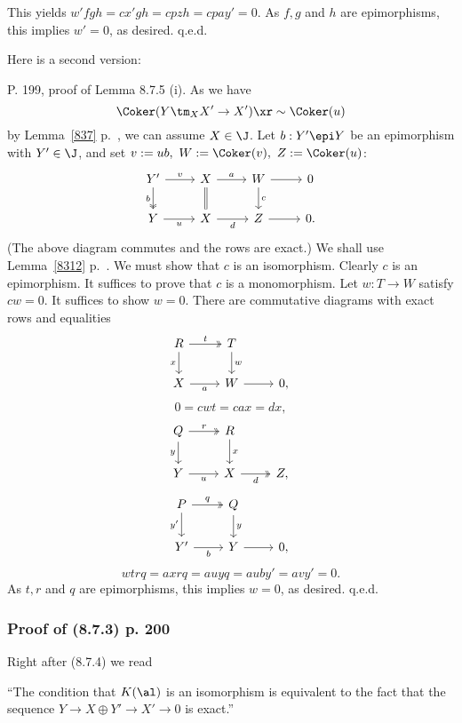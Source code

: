 \documentclass[12pt]{article}
\theoremstyle{remark}
\theoremstyle{definition}
\begin{document}
This yields $w'fgh=cx'gh=cpzh=cpay'=0$. As $f,g$ and $h$ are epimorphisms, this implies $w'=0$, as desired. q.e.d. 

Here is a second version: 


P. 199, proof of Lemma 8.7.5 (i). As we have 
$$
\Coker(Y\tm_XX'\to X')\xr\sim\Coker(u)
$$ 
by Lemma~\ref{837} p.~, we can assume $X\in\J$. Let $b:Y'\epi Y$ be an epimorphism with $Y'\in\J$, and set $v:=ub,\ W:=\Coker(v),\ Z:=\Coker(u)$: 
$$
\begin{tikzcd}
Y'\ar[d,two heads,"b"']\ar[r,"v"]&X\ar[d,equal]\ar[r,"a"]&W\ar[d,"c"]\ar[r]&0\\ 
Y\ar[r,"u"']&X\ar[r,"d"']&Z\ar[r]&0.
\end{tikzcd}
$$ 
(The above diagram commutes and the rows are exact.) We shall use Lemma~\ref{8312} p.~. We must show that $c$ is an isomorphism. Clearly $c$ is an epimorphism. It suffices to prove that $c$ is a monomorphism. Let $w:T\to W$ satisfy $cw=0$. It suffices to show $w=0$. There are commutative diagrams with exact rows and equalities 
$$
\begin{tikzcd}
R\ar[d,"x"']\ar[r,two heads,"t"]&T\ar[d,"w"]\\ 
X\ar[r,"a"']&W\ar[r]&0,
\end{tikzcd}
$$ 
$$
0=cwt=cax=dx,
$$ 
$$
\begin{tikzcd}
Q\ar[d,"y"']\ar[r,two heads,"r"]&R\ar[d,"x"]\\ 
Y\ar[r,"u"']&X\ar[r,two heads,"d"']&Z,
\end{tikzcd}
$$ 
$$
\begin{tikzcd}
P\ar[d,"y'"']\ar[r,two heads,"q"]&Q\ar[d,"y"]\\ 
Y'\ar[r,"b"']&Y\ar[r]&0,
\end{tikzcd}
$$ 
$$
wtrq=axrq=auyq=auby'=avy'=0.
$$ 
As $t,r$ and $q$ are epimorphisms, this implies $w=0$, as desired. q.e.d.

%

\subsubsection{Proof of (8.7.3) p. 200}

Right after (8.7.4) we read

``The condition that $K(\al)$ is an isomorphism is equivalent to the fact that the
sequence $Y\to X\oplus Y'\to X'\to0$ is exact.''
\end{document}
